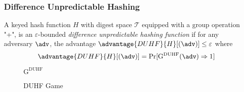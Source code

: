 \subsubsection{Difference Unpredictable Hashing} A keyed hash function $H$ with digest space $\mathcal{T}$ equipped with a group operation "+", is an $\varepsilon$-bounded \textit{difference unpredictable hashing function} if for any adversary $\adv$, the advantage $\advantage{DUHF}{H}[(\adv)] \leq \varepsilon$ where 
$$
\advantage{DUHF}{H}[(\adv)] = \Pr[\mathrm{G}^\text{DUHF}(\adv) \Rightarrow 1]
$$

\begin{figure}[!h]
\centering
\begin{codeframe}[colback = white, width=6.25cm, height=5cm]
{$\mathrm{G}^{\text{DUHF}}$}
\begin{pchstack}
\end{pchstack}
\end{codeframe}
\caption{DUHF Game}
\label{fig:duhf-game}
\end{figure}
